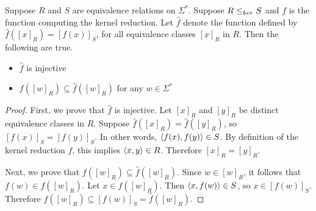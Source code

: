 \begin{lemma}\label{lem:image}
  Suppose $R$ and $S$ are equivalence relations on $\Sigma^*$.
  Suppose $R \leq_{ker} S$ and $f$ is the function computing the kernel reduction.
  Let $\hat{f}$ denote the function defined by $\hat{f}([x]_R) = [f(x)]_S$, for all equivalence classes $[x]_R$ in $R$.
  Then the following are true.
  \begin{itemize}
  \item $\hat{f}$ is injective
  \item $f([w]_R) \subseteq \hat{f}([w]_R)$ for any $w \in \Sigma^*$
  \end{itemize}
\end{lemma}
\begin{proof}
  First, we prove that $\hat{f}$ is injective.
  Let $[x]_R$ and $[y]_R$ be distinct equivalence classes in $R$.
  Suppose $\hat{f}([x]_R) = \hat{f}([y]_R)$, so $[f(x)]_S = [f(y)]_S$.
  In other words, $\left\langle f(x),f(y)\right\rangle \in S$.
  By definition of the kernel reduction $f$, this implies $\left\langle x,y\right\rangle \in R$.
  Therefore $[x]_R = [y]_R$.

  Next, we prove that $f([w]_R) \subseteq \hat{f}([w]_R)$.
  Since $w \in [w]_R$, it follows that $f(w) \in f([w]_R)$.
  Let $x \in f([w]_R)$.
  Then $\left\langle x,f(w)\right\rangle \in S$, so $x \in [f(w)]_S$.
  Therefore $f([w]_R) \subseteq [f(w)]_S = \hat{f}([w]_R)$.
\end{proof}

